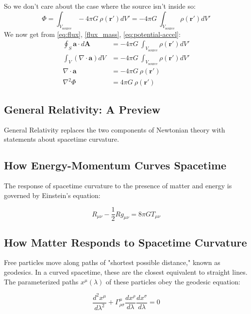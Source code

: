 \documentclass[11pt, a4paper]{report}
\newcommand{\eqn}[1]{\hyperref[#1]{\eqref{#1}}}
\begin{document}
So we don't care about the case where the source isn't inside so:
\begin{equation}\label{flux_mass}
\Phi = \int_{V_{\text{source}}} -4 \pi G \ \rho(\mathbf{r}')  dV' =  -4 \pi G \ \int_{V_{\text{source}}}\rho(\mathbf{r}')  dV'
\end{equation}
We now get from \eqn{eq:flux}, \eqn{flux_mass}, \eqn{eq:potential-accel}:
\begin{align*}
    \oint_S \mathbf{a} \cdot d\mathbf{A} &= -4 \pi G \ \int_{V_{\text{source}}}\rho(\mathbf{r}')  dV' \\
    \int_V (\nabla \cdot \mathbf{a}) dV &= -4 \pi G \ \int_{V_{\text{source}}}\rho(\mathbf{r}')  dV' \\
    \nabla \cdot \mathbf{a} &= -4 \pi G \ \rho(\mathbf{r'}) \\
    \nabla^2 \Phi &= 4 \pi G \ \rho(\mathbf{r'})
\end{align*}
\subsection*{General Relativity: A Preview}
General Relativity replaces the two components of Newtonian theory with statements about spacetime curvature.

\subsection*{How Energy-Momentum Curves Spacetime}

The response of spacetime curvature to the presence of matter and energy is governed by Einstein's equation:

\begin{equation}\label{eq:einstein}
    R_{\mu\nu} - \frac{1}{2} R g_{\mu\nu} = 8\pi G T_{\mu\nu}
\end{equation}

\subsection*{How Matter Responds to Spacetime Curvature}

Free particles move along paths of "shortest possible distance," known as geodesics. 
In a curved spacetime, these are the closest equivalent to straight lines.
The parameterized paths $x^{\mu}(\lambda)$ of these particles obey the geodesic equation:

\begin{equation}\label{eq:geodesic}
    \frac{d^2 x^{\mu}}{d\lambda^2} 
    + \Gamma^{\mu}_{\rho\sigma} 
    \frac{dx^{\rho}}{d\lambda} 
    \frac{dx^{\sigma}}{d\lambda} = 0
\end{equation}
\end{document}
